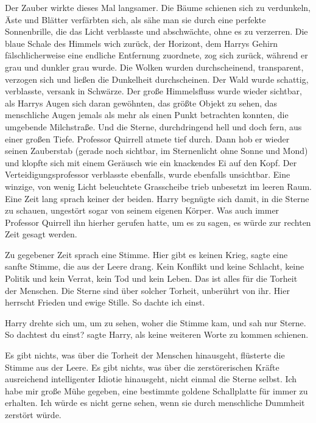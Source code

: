 Der Zauber wirkte dieses Mal langsamer. Die Bäume schienen sich zu verdunkeln,
Äste und Blätter verfärbten sich, als sähe man sie durch eine perfekte
Sonnenbrille, die das Licht verblasste und abschwächte, ohne es zu verzerren.
Die blaue Schale des Himmels wich zurück, der Horizont, dem Harrys Gehirn
fälschlicherweise eine endliche Entfernung zuordnete, zog sich zurück, während
er grau und dunkler grau wurde. Die Wolken wurden durchscheinend, transparent,
verzogen sich und ließen die Dunkelheit durchscheinen. Der Wald wurde schattig,
verblasste, versank in Schwärze. Der große Himmelsfluss wurde wieder sichtbar,
als Harrys Augen sich daran gewöhnten, das größte Objekt zu sehen, das
menschliche Augen jemals als mehr als einen Punkt betrachten konnten, die
umgebende Milchstraße. Und die Sterne, durchdringend hell und doch fern, aus
einer großen Tiefe. Professor Quirrell atmete tief durch. Dann hob er wieder
seinen Zauberstab (gerade noch sichtbar, im Sternenlicht ohne Sonne und Mond)
und klopfte sich mit einem Geräusch wie ein knackendes Ei auf den Kopf. Der
Verteidigungsprofessor verblasste ebenfalls, wurde ebenfalls unsichtbar. Eine
winzige, von wenig Licht beleuchtete Grasscheibe trieb unbesetzt im leeren Raum.
Eine Zeit lang sprach keiner der beiden. Harry begnügte sich damit, in die
Sterne zu schauen, ungestört sogar von seinem eigenen Körper. Was auch immer
Professor Quirrell ihn hierher gerufen hatte, um es zu sagen, es würde zur
rechten Zeit gesagt werden.

Zu gegebener Zeit sprach eine Stimme. \glqq Hier gibt es keinen Krieg\grqq{},
sagte eine sanfte Stimme, die aus der Leere drang. \glqq Kein Konflikt und keine
Schlacht, keine Politik und kein Verrat, kein Tod und kein Leben. Das ist alles
für die Torheit der Menschen. Die Sterne sind über solcher Torheit, unberührt
von ihr. Hier herrscht Frieden und ewige Stille. So dachte ich einst.\grqq{}

Harry drehte sich um, um zu sehen, woher die Stimme kam, und sah nur Sterne.
\glqq So dachtest du einst?\grqq{} sagte Harry, als keine weiteren Worte zu
kommen schienen.

\glqq Es gibt nichts, was über die Torheit der Menschen hinausgeht\grqq{},
flüsterte die Stimme aus der Leere. \glqq Es gibt nichts, was über die
zerstörerischen Kräfte ausreichend intelligenter Idiotie hinausgeht, nicht
einmal die Sterne selbst. Ich habe mir große Mühe gegeben, eine bestimmte
goldene Schallplatte für immer zu erhalten. Ich würde es nicht gerne sehen, wenn
sie durch menschliche Dummheit zerstört würde.\grqq{}

